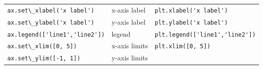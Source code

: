 \documentclass{book}
\newcommand{\passthrough}[1]{#1}
\begin{document}
\begin{longtable}[]{@{}lll@{}}
\begin{minipage}[t]{0.30\columnwidth}
\passthrough{\lstinline!ax.set\_xlabel('x label')!}\strut
\end{minipage} & \begin{minipage}[t]{0.30\columnwidth}\raggedright
x-axis label\strut
\end{minipage} & \begin{minipage}[t]{0.30\columnwidth}\raggedright
\passthrough{\lstinline!plt.xlabel('x label')!}\strut
\end{minipage}\tabularnewline
\begin{minipage}[t]{0.30\columnwidth}\raggedright
\passthrough{\lstinline!ax.set\_ylabel('x label')!}\strut
\end{minipage} & \begin{minipage}[t]{0.30\columnwidth}\raggedright
y-axis label\strut
\end{minipage} & \begin{minipage}[t]{0.30\columnwidth}\raggedright
\passthrough{\lstinline!plt.ylabel('x label')!}\strut
\end{minipage}\tabularnewline
\begin{minipage}[t]{0.30\columnwidth}\raggedright
\passthrough{\lstinline!ax.legend(['line1','line2'])!}\strut
\end{minipage} & \begin{minipage}[t]{0.30\columnwidth}\raggedright
legend\strut
\end{minipage} & \begin{minipage}[t]{0.30\columnwidth}\raggedright
\passthrough{\lstinline!plt.legend(['line1','line2'])!}\strut
\end{minipage}\tabularnewline
\begin{minipage}[t]{0.30\columnwidth}\raggedright
\passthrough{\lstinline!ax.set\_xlim([0, 5])!}\strut
\end{minipage} & \begin{minipage}[t]{0.30\columnwidth}\raggedright
x-axis limits\strut
\end{minipage} & \begin{minipage}[t]{0.30\columnwidth}\raggedright
\passthrough{\lstinline!plt.xlim([0, 5])!}\strut
\end{minipage}\tabularnewline
\begin{minipage}[t]{0.30\columnwidth}\raggedright
\passthrough{\lstinline!ax.set\_ylim([-1, 1])!}\strut
\end{minipage} & \begin{minipage}[t]{0.30\columnwidth}\raggedright
y-axis limits\strut
\end{minipage} & \begin{minipage}[t]{0.30\columnwidth}\raggedright

\end{minipage}
\end{longtable}
\end{document}

